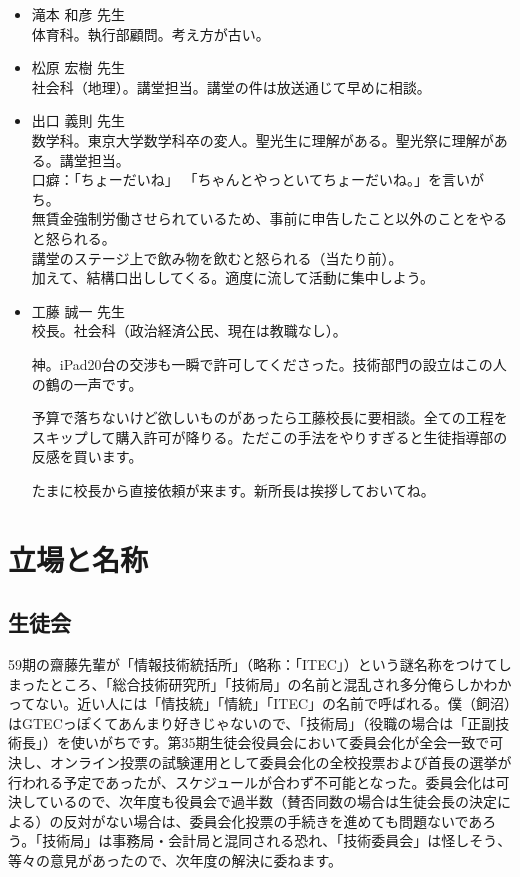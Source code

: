 \documentclass[dvipdfmx,jb5]{jarticle}
\begin{document}
\begin{itemize}
  \item 滝本 和彦 先生\\
  体育科。執行部顧問。考え方が古い。

  \item 松原 宏樹 先生\\
  社会科（地理）。講堂担当。講堂の件は放送通じて早めに相談。

  \item 出口 義則 先生\\
  数学科。東京大学数学科卒の変人。聖光生に理解がある。聖光祭に理解がある。講堂担当。
  \\口癖：「ちょーだいね」
  「ちゃんとやっといてちょーだいね。」を言いがち。\\
  無賃金強制労働させられているため、事前に申告したこと以外のことをやると怒られる。\\
  講堂のステージ上で飲み物を飲むと怒られる（当たり前）。\\
  加えて、結構口出ししてくる。適度に流して活動に集中しよう。

  \item 工藤 誠一 先生\\
  校長。社会科（政治経済公民、現在は教職なし）。

  神。iPad20台の交渉も一瞬で許可してくださった。技術部門の設立はこの人の鶴の一声です。

  予算で落ちないけど欲しいものがあったら工藤校長に要相談。全ての工程をスキップして購入許可が降りる。ただこの手法をやりすぎると生徒指導部の反感を買います。

  たまに校長から直接依頼が来ます。新所長は挨拶しておいてね。
\end{itemize}

\section{立場と名称}
\subsection{生徒会}
59期の齋藤先輩が「情報技術統括所」（略称：「ITEC」）という謎名称をつけてしまったところ、「総合技術研究所」「技術局」の名前と混乱され多分俺らしかわかってない。近い人には「情技統」「情統」「ITEC」の名前で呼ばれる。僕（飼沼）はGTECっぽくてあんまり好きじゃないので、「技術局」（役職の場合は「正副技術長」）を使いがちです。第35期生徒会役員会において委員会化が全会一致で可決し、オンライン投票の試験運用として委員会化の全校投票および首長の選挙が行われる予定であったが、スケジュールが合わず不可能となった。委員会化は可決しているので、次年度も役員会で過半数（賛否同数の場合は生徒会長の決定による）の反対がない場合は、委員会化投票の手続きを進めても問題ないであろう。「技術局」は事務局・会計局と混同される恐れ、「技術委員会」は怪しそう、等々の意見があったので、次年度の解決に委ねます。
\end{document}
